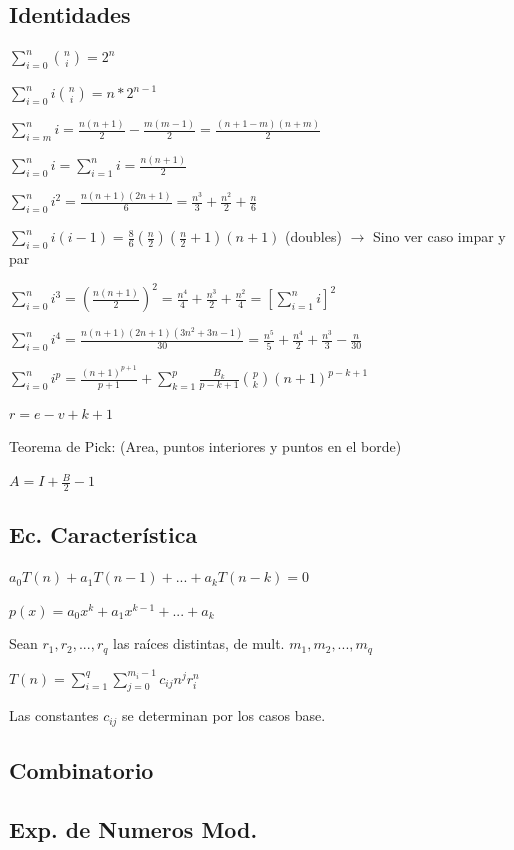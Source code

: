 \subsection{Identidades}
{
$\sum_{i=0}^n\binom{n}{i}=2^n$

$\sum_{i=0}^n i\binom{n}{i}=n*2^{n-1}$

$\sum_{i=m}^n i = \frac{n(n+1)}{2} - \frac{m(m-1)}{2} = \frac{(n+1-m)(n+m)}{2}$

$\sum_{i=0}^n i = \sum_{i=1}^n i = \frac{n(n+1)}{2}$

$\sum_{i=0}^n i^2 = \frac{n(n+1)(2n+1)}{6} = \frac{n^3}{3} + \frac{n^2}{2} + \frac{n}{6}$

$\sum_{i=0}^n i(i-1) = \frac{8}{6}(\frac{n}{2})(\frac{n}{2}+1)(n+1)$ (doubles) $\rightarrow$ Sino ver caso impar y par

$\sum_{i=0}^n i^3 = \left(\frac{n(n+1)}{2}\right)^2 = \frac{n^4}{4} + \frac{n^3}{2} + \frac{n^2}{4} = \left[\sum_{i=1}^n i\right]^2$

$\sum_{i=0}^n i^4 = \frac{n(n+1)(2n+1)(3n^2+3n-1)}{30} = \frac{n^5}{5} + \frac{n^4}{2} + \frac{n^3}{3} - \frac{n}{30}$

$\sum_{i=0}^n i^p = \frac{(n+1)^{p+1}}{p+1} + \sum_{k=1}^p\frac{B_k}{p-k+1}{p\choose k}(n+1)^{p-k+1}$

$r=e-v+k+1$

Teorema de Pick: (Area, puntos interiores y puntos en el borde)

$A=I+\frac{B}{2}-1$


}%
\subsection{Ec. Característica}
$a_0T(n)+a_1T(n-1)+...+a_kT(n-k)=0$

$p(x)=a_0 x^k + a_1 x^{k-1} + ... + a_k$

Sean $r_1,r_2,...,r_q$ las raíces distintas, de mult. $m_1, m_2, ..., m_q$

$T(n)=\sum_{i=1}^q{\sum_{j=0}^{m_i - 1}c_{ij} n^j r_i^n}$

Las constantes $c_{ij}$ se determinan por los casos base.
\subsection{Combinatorio}
\subsection{Exp. de Numeros Mod.}
